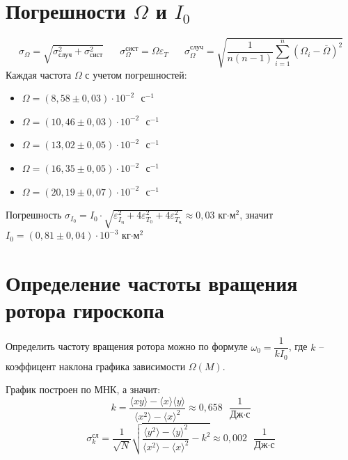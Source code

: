 \documentclass[a4paper, 12pt]{article}
\begin{document}
	\section{Погрешности $\Omega$ и $I_0$}
    \begin{equation}
		\sigma_\Omega = \sqrt{ \sigma_\text{случ}^2 + \sigma_\text{сист}^2} \;\;\;\;\;\; \sigma_\Omega^\text{сист} = \Omega{} \varepsilon_T \;\;\;\;\;\; \sigma_\Omega^\text{случ}=  \sqrt{\frac{1}{n(n-1)} \sum_{i=1}^{n}(\Omega_i - \overline{\Omega})^2}
	\end{equation}
	\newpage
	Каждая частота $\Omega$ с учетом погрешностей:
	\begin{itemize}
		\item $\Omega = (8,58 \pm 0,03)\cdot10^{-2}\text{ }\text{с}^{-1}$ 
		\item $\Omega = (10,46 \pm 0,03)\cdot10^{-2}\text{ }\text{с}^{-1}$
		\item $\Omega = (13,02 \pm 0,05)\cdot10^{-2}\text{ }\text{с}^{-1}$
		\item $\Omega = (16,35 \pm 0,05)\cdot10^{-2}\text{ }\text{с}^{-1}$
		\item $\Omega = (20,19 \pm 0,07)\cdot10^{-2}\text{ }\text{с}^{-1}$
	\end{itemize}

    Погрешность $\sigma_{I_0} = I_0\cdot\sqrt{\varepsilon_{I_\text{ц}}^2+ 4\varepsilon_{T_0}^2+ 4\varepsilon_{T_\text{ц}}^2 } \approx 0,03$ кг$\cdot \text{м}^2$, значит $I_0 = (0,81\pm 0,04) \cdot 10^{-3}$ кг$\cdot \text{м}^2$
	
	\section{Определение частоты вращения ротора гироскопа}
	
	Определить частоту вращения ротора можно по формуле $\omega_0 = \dfrac{1}{kI_0}$, где $k$ -- коэффицент наклона графика зависимости $\Omega(M)$.
	
	График построен по МНК, а значит:
	\begin{equation}
	k=\frac{\langle xy\rangle-\langle x\rangle \langle y\rangle}{\langle x^2\rangle - \langle x\rangle^2}\approx 0,658\text{ }\frac{1}{\text{Дж}\cdot\text{с}}
	\end{equation}
	\begin{equation}
		\sigma_k^\text{сл}=\frac{1}{\sqrt{N}}\sqrt{\frac{\langle y^2 \rangle - \langle y \rangle^2}{\langle x^2 \rangle - \langle x \rangle^2} - k^2  } \approx 0,002\text{ }\frac{1}{\text{Дж}\cdot\text{с}}
	\end{equation}
\end{document}
